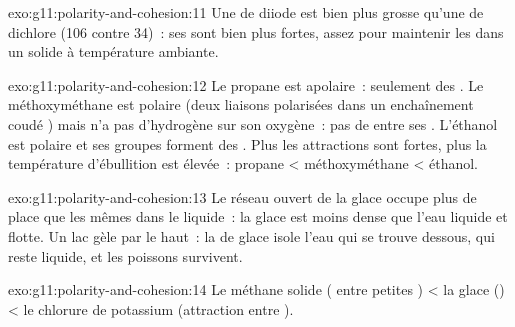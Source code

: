 \begin{solution}{exo:g11:polarity-and-cohesion:11}
Une  de diiode est bien plus grosse qu'une  de dichlore
(106  contre 34)~: ses  sont bien
plus fortes, assez pour maintenir les  dans un solide à
température ambiante.
\end{solution}

\begin{solution}{exo:g11:polarity-and-cohesion:12}
Le propane est apolaire~: seulement des .
Le méthoxyméthane est polaire (deux liaisons  polarisées dans un
enchaînement coudé ) mais n'a pas d'hydrogène sur son
oxygène~: pas de  entre ses . L'éthanol est
polaire et ses groupes  forment des . Plus les
attractions sont fortes, plus la température d'ébullition est élevée~:
propane < méthoxyméthane < éthanol.
\end{solution}

\begin{solution}{exo:g11:polarity-and-cohesion:13}
Le réseau ouvert de la glace occupe plus de place que les mêmes
 dans le liquide~: la glace est moins dense que l'eau liquide
et flotte. Un lac gèle par le haut~: la  de glace isole l'eau qui
se trouve dessous, qui reste liquide, et les poissons survivent.
\end{solution}

\begin{solution}{exo:g11:polarity-and-cohesion:14}
Le méthane solide ( entre petites
) < la glace () < le chlorure de potassium
(attraction entre ).
\end{solution}

